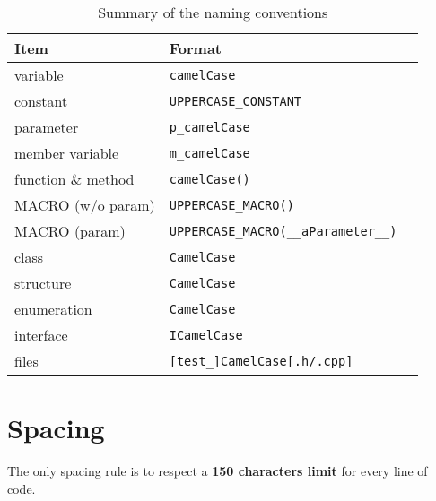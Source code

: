 \begin{table}[H]
  \begin{tabular}{|l|l|l|}
    \hline
    \textbf{Item}              & \textbf{Format}                              \\
    \hline\hline
    variable                   & \texttt{camelCase}                           \\
    constant                   & \texttt{UPPERCASE\_CONSTANT}                 \\
    parameter                  & \texttt{p\_camelCase}                        \\
    member variable            & \texttt{m\_camelCase}                        \\
    function \& method         & \texttt{camelCase()}                         \\
    MACRO (w/o param)          & \texttt{UPPERCASE\_MACRO()}                  \\
    MACRO (param)              & \texttt{UPPERCASE\_MACRO(\_\_aParameter\_\_)}\\
    class                      & \texttt{CamelCase}                           \\
    structure                  & \texttt{CamelCase}                           \\
    enumeration                & \texttt{CamelCase}                           \\
    interface                  & \texttt{ICamelCase}                          \\
    files                      & \texttt{[test\_]CamelCase[.h/.cpp]}          \\
    \hline
  \end{tabular} 
  \caption{Summary of the naming conventions}
  \label{tblNamingConventions}
\end{table} 

\section{Spacing}

The only spacing rule is to respect a \textbf{150 characters limit} for every
line of code.